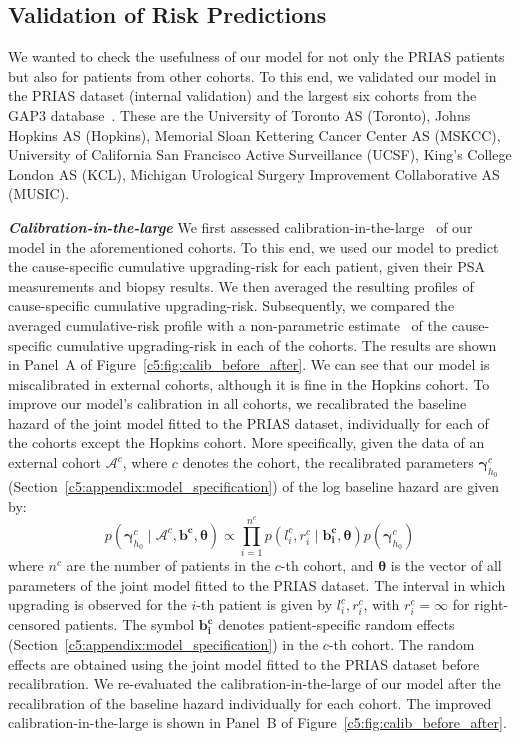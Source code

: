 \begin{subappendices}
\subsection{Validation of Risk Predictions}
\label{c5:appendix:validation}
We wanted to check the usefulness of our model for not only the PRIAS patients but also for patients from other cohorts. To this end, we validated our model in the PRIAS dataset (internal validation) and the largest six cohorts from the GAP3 database~\citep{gap3_2018}. These are the University of Toronto AS (Toronto), Johns Hopkins AS (Hopkins), Memorial Sloan Kettering Cancer Center AS (MSKCC), University of California San Francisco Active Surveillance (UCSF), King's College London AS (KCL), Michigan Urological Surgery Improvement Collaborative AS (MUSIC).

\textbf{\textit{Calibration-in-the-large}}
We first assessed calibration-in-the-large~\citep{steyerberg2010assessing} of our model in the aforementioned cohorts. To this end, we used our model to predict the cause-specific cumulative upgrading-risk for each patient, given their PSA measurements and biopsy results. We then averaged the resulting profiles of cause-specific cumulative upgrading-risk. Subsequently, we compared the averaged cumulative-risk profile with a non-parametric estimate~\citep{turnbull1976empirical} of the cause-specific cumulative upgrading-risk in each of the cohorts. The results are shown in Panel~A of Figure~\ref{c5:fig:calib_before_after}. We can see that our model is miscalibrated in external cohorts, although it is fine in the Hopkins cohort. To improve our model's calibration in all cohorts, we recalibrated the baseline hazard of the joint model fitted to the PRIAS dataset, individually for each of the cohorts except the Hopkins cohort. More specifically, given the data of an external cohort $\mathcal{A}^c$, where $c$ denotes the cohort, the recalibrated parameters $\boldsymbol{\gamma}_{h_0}^c$ (Section~\ref{c5:appendix:model_specification}) of the log baseline hazard are given by:
\begin{equation}
p(\boldsymbol{\gamma}_{h_0}^c \mid \mathcal{A}^c, \boldsymbol{b^c},  \boldsymbol{\theta}) \propto \prod_{i=1}^{n^c} p(l_i^c, r_i^c \mid \boldsymbol{b^c_i}, \boldsymbol{\theta}) p(\boldsymbol{\gamma}_{h_0}^c)
\end{equation}
where $n^c$ are the number of patients in the $c$-th cohort, and $\boldsymbol{\theta}$ is the vector of all parameters of the joint model fitted to the PRIAS dataset. The interval in which upgrading is observed for the $i$-th patient is given by $l_i^c, r_i^c$, with $r_i^c = \infty$ for right-censored patients. The symbol $\boldsymbol{b^c_i}$ denotes patient-specific random effects (Section~\ref{c5:appendix:model_specification}) in the $c$-th cohort. The random effects are obtained using the joint model fitted to the PRIAS dataset before recalibration. We re-evaluated the calibration-in-the-large of our model after the recalibration of the baseline hazard individually for each cohort. The improved calibration-in-the-large is shown in Panel~B of Figure~\ref{c5:fig:calib_before_after}.


\end{subappendices}
